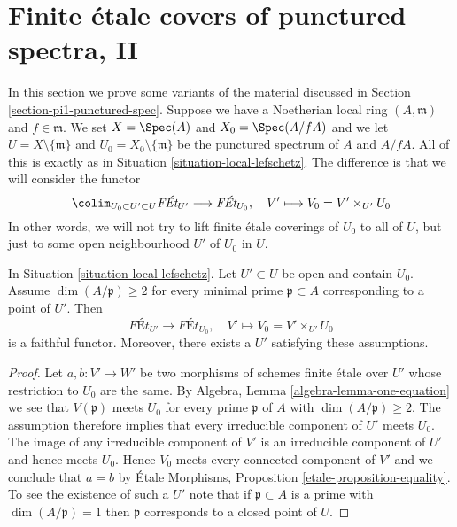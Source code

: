 
















\section{Finite \'etale covers of punctured spectra, II}
\label{section-pi1-punctured-spec-II}

\noindent
In this section we prove some variants of the material discussed
in Section \ref{section-pi1-punctured-spec}. Suppose
we have a Noetherian local ring $(A, \mathfrak m)$ and $f \in \mathfrak m$.
We set $X = \Spec(A)$ and $X_0 = \Spec(A/fA)$ and we
let $U = X \setminus \{\mathfrak m\}$ and
$U_0 = X_0 \setminus \{\mathfrak m\}$ be the punctured spectrum of
$A$ and $A/fA$. All of this is exactly as in
Situation \ref{situation-local-lefschetz}.
The difference is that we will consider the functor
$$
\colim_{U_0 \subset U' \subset U} \textit{F\'Et}_{U'}
\longrightarrow \textit{F\'Et}_{U_0},\quad
V' \longmapsto V_0 = V' \times_{U'} U_0
$$
In other words, we will not try to lift finite \'etale coverings
of $U_0$ to all of $U$, but just to some open neighbourhood
$U'$ of $U_0$ in $U$.

\begin{lemma}
\label{lemma-faithful-general}
In Situation \ref{situation-local-lefschetz}.
Let $U' \subset U$ be open and contain $U_0$.
Assume $\dim(A/\mathfrak p) \geq 2$ for every minimal prime
$\mathfrak p \subset A$ corresponding to a point of $U'$. Then
$$
\textit{F\'Et}_{U'} \longrightarrow \textit{F\'Et}_{U_0},\quad
V' \longmapsto V_0 = V' \times_{U'} U_0
$$
is a faithful functor. Moreover, there exists a $U'$ satisfying
these assumptions.
\end{lemma}

\begin{proof}
Let $a, b : V' \to W'$ be two morphisms of schemes finite \'etale
over $U'$ whose restriction to $U_0$ are the same. By
Algebra, Lemma \ref{algebra-lemma-one-equation}
we see that $V(\mathfrak p)$ meets $U_0$ for
every prime $\mathfrak p$ of $A$ with $\dim(A/\mathfrak p) \geq 2$.
The assumption therefore implies that every
irreducible component of $U'$ meets $U_0$.
The image of any irreducible component of $V'$ is an
irreducible component of $U'$ and hence meets $U_0$.
Hence $V_0$ meets every connected component of $V'$ and
we conclude that $a = b$ by \'Etale Morphisms, Proposition
\ref{etale-proposition-equality}.
To see the existence of such a $U'$ note that if
$\mathfrak p \subset A$ is a prime with $\dim(A/\mathfrak p) = 1$
then $\mathfrak p$ corresponds to a closed point of $U$.
\end{proof}

